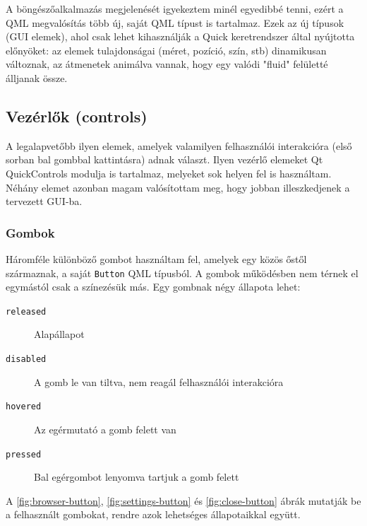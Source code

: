 \documentclass[12pt]{report}
\begin{document}
A böngészőalkalmazás megjelenését igyekeztem minél egyedibbé tenni, ezért a QML megvalósítás
több új, saját QML típust is tartalmaz. Ezek az új típusok (GUI elemek), ahol csak lehet
kihasználják a Quick keretrendszer által nyújtotta előnyöket: az elemek tulajdonságai
(méret, pozíció, szín, stb) dinamikusan változnak, az átmenetek animálva vannak, hogy
egy valódi "fluid" felületté álljanak össze.

\subsection{Vezérlők (controls)}
A legalapvetőbb ilyen elemek, amelyek valamilyen felhasználói interakcióra (első sorban
bal gombbal kattintásra) adnak választ. Ilyen vezérlő elemeket Qt QuickControls modulja
is tartalmaz, melyeket sok helyen fel is használtam. Néhány elemet azonban magam valósítottam
meg, hogy jobban illeszkedjenek a tervezett GUI-ba.

\subsubsection{Gombok}
Háromféle különböző gombot használtam fel, amelyek egy közös őstől származnak,
a saját \texttt{Button} QML típusból. A gombok működésben nem térnek el egymástól csak a
színezésük más. Egy gombnak négy állapota lehet:
\begin{description}
    \item[\texttt{released}] Alapállapot
    \item[\texttt{disabled}] A gomb le van tiltva, nem reagál felhasználói interakcióra
    \item[\texttt{hovered}] Az egérmutató a gomb felett van
    \item[\texttt{pressed}] Bal egérgombot lenyomva tartjuk a gomb felett
\end{description}

A \ref{fig:browser-button}, \ref{fig:settings-button} és \ref{fig:close-button} ábrák
mutatják be a felhasznált gombokat, rendre azok lehetséges állapotaikkal együtt.
\end{document}
